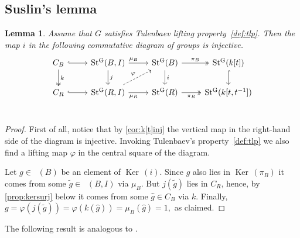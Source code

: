 \documentclass[oneside,12pt]{amsart}
\numberwithin{equation}{section}
\newtheorem{lem}{Lemma}
\numberwithin{lem}{section}
\theoremstyle{definition}
\theoremstyle{remark}
\DeclareMathOperator{\St}{St^G}
\DeclareMathOperator{\Bigker}{Ker\,}
\begin{document}

\subsection{Suslin's lemma}



\begin{lem} \label{lem:tulinj}
Assume that $G$ satisfies Tulenbaev lifting property~\ref{def:tlp}.
Then the map $i$ in the following commutative diagram of groups is injective.
\begin{equation} \label{diag:cs} \begin{tikzcd}
C_{B} \ar[r, hookrightarrow] \ar[d, "k", twoheadrightarrow] & \St(B, I) \ar[r, "\mu_B" near start] \ar[d, "j"] & \ar[d, "i"] \St(B) \ar[r, "\pi_B", twoheadrightarrow] & \St(k[t]) \ar[d, hookrightarrow] \\
C_{R} \ar[r, hookrightarrow]                                & \St(R, I) \ar[ur, dashrightarrow, "\varphi"] \ar[r, "\mu_R"' near start] & \St(R) \ar[r, "\pi_R"', twoheadrightarrow] & \St(k[t, t^{-1}]) \\ \end{tikzcd} \end{equation} \end{lem}
\begin{proof} First of all, notice that by \cref{cor:k[t]inj} the vertical map in the right-hand side of the diagram is injective.
 Invoking Tulenbaev's property~\ref{def:tlp} we also find a lifting map $\varphi$ in the central square of the diagram.

 Let $g \in \St(B)$ be an element of $\Bigker(i)$.
 Since $g$ also lies in $\Bigker(\pi_B)$ it comes from some $\widetilde{g} \in \St(B, I)$ via $\mu_B$.
 But $j(\widetilde{g})$ lies in $C_R$, hence, by \cref{prop:kersurj} below it comes from some $\widehat{g} \in C_B$ via $k$.
 Finally, $g = \varphi(j(\widetilde{g})) = \varphi(k(\widehat{g})) = \mu_B(\widehat{g}) = 1,$ as claimed. \end{proof}

The following result is analogous to \cite[Proposition~4.1]{Tu}.
\end{document}
